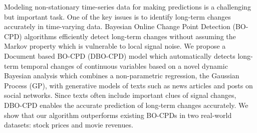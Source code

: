 Modeling non-stationary time-series data for making predictions is a challenging but important task. One of the key issues is to identify long-term changes accurately in time-varying data. Bayesian Online Change Point Detection (BO-CPD) algorithms efficiently detect long-term changes without assuming the Markov property which is vulnerable to local signal noise. We propose a Document based BO-CPD (DBO-CPD) model which automatically detects long-term temporal changes of continuous variables based on a novel dynamic Bayesian analysis which combines a non-parametric regression, the Gaussian Process (GP), with generative models of texts such as news articles and posts on social networks. Since texts often include important clues of signal changes, DBO-CPD enables the accurate prediction of long-term changes accurately. We show that our algorithm outperforms existing BO-CPDs in two real-world datasets: stock prices and movie revenues.
